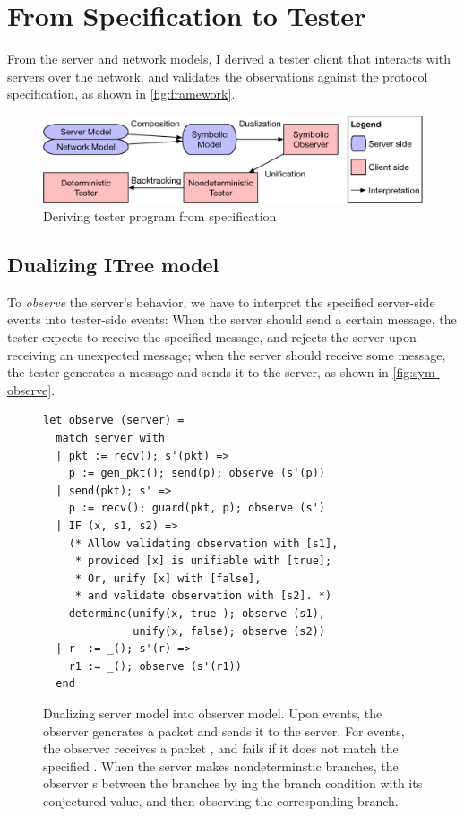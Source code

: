 \section{From Specification to Tester}
\label{sec:spec-to-test}

From the server and network models, I derived a tester client that interacts
with servers over the network, and validates the observations against the
protocol specification, as shown in \autoref{fig:framework}.

\begin{figure}
  \includegraphics[width=\linewidth]{figures/framework}
  \caption{Deriving tester program from specification}
  \label{fig:framework}
\end{figure}

\subsection{Dualizing ITree model}
To {\em observe} the server's behavior, we have to interpret the specified
server-side events into tester-side events: When the server should send a
certain message, the tester expects to receive the specified message, and
rejects the server upon receiving an unexpected message; when the server should
receive some message, the tester generates a message and sends it to the server,
as shown in \autoref{fig:sym-observe}.

\begin{figure}
  \begin{lstlisting}[style=customcoq]
let observe (server) =
  match server with
  | pkt := recv(); s'(pkt) =>
    p := gen_pkt(); send(p); observe (s'(p))
  | send(pkt); s' =>
    p := recv(); guard(pkt, p); observe (s')
  | IF (x, s1, s2) =>
    (* Allow validating observation with [s1],
     * provided [x] is unifiable with [true];
     * Or, unify [x] with [false],
     * and validate observation with [s2]. *)
    determine(unify(x, true ); observe (s1),
              unify(x, false); observe (s2))
  | r  := _(); s'(r) =>
    r1 := _(); observe (s'(r1))
  end
  \end{lstlisting}
  \caption{Dualizing server model into observer model.  Upon  events,
    the observer generates a packet and sends it to the server.  For 
    events, the observer receives a packet , and fails if it does not
    match the specified .  When the server makes nondeterminstic
     branches, the observer s between the branches by
    ing the branch condition with its conjectured value, and then
    observing the corresponding branch.
  }
  \label{fig:sym-observe}
\end{figure}

